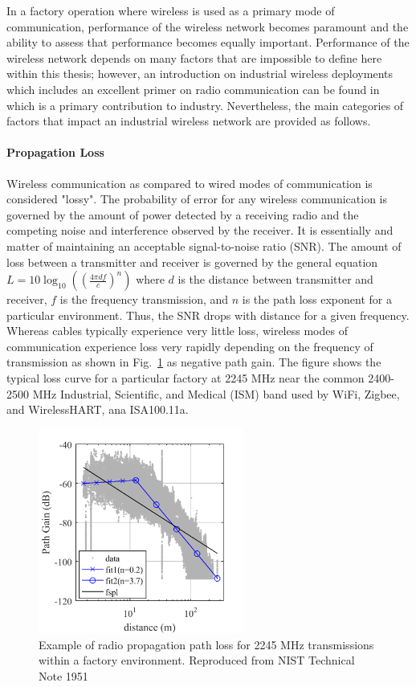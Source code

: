 In a factory operation where wireless is used as a primary mode of communication, performance of the wireless network becomes paramount and the ability to assess that performance becomes equally important.  Performance of the wireless network depends on many factors that are impossible to define here within this thesis; however, an introduction on industrial wireless deployments which includes an excellent primer on radio communication can be found in~\cite{Candell2018.IWSGuide} which is a primary contribution to industry.  Nevertheless, the main categories of factors that impact an industrial wireless network are provided as follows.

\paragraph{Propagation Loss} Wireless communication as compared to wired modes of communication is considered "lossy".  The probability of error for any wireless communication is governed by the amount of power detected by a receiving radio and the competing noise and interference observed by the receiver.  It is essentially and matter of maintaining an acceptable signal-to-noise ratio (SNR). The amount of loss between a transmitter and receiver is governed by the general equation $L=10\log_{10}\left(\left(\frac{4\pi d f}{c}\right)^n\right)$ where $d$ is the distance between transmitter and receiver, $f$ is the frequency transmission, and $n$ is the path loss exponent for a particular environment.  Thus, the SNR drops with distance for a given frequency.  Whereas cables typically experience very little loss, wireless modes of communication experience loss very rapidly depending on the frequency of transmission as shown in Fig.~\ref{intro:pathloss-example} as negative path gain.  The figure shows the typical loss curve for a particular factory at 2245 MHz near the common 2400-2500 MHz Industrial, Scientific, and Medical (ISM) band used by WiFi, Zigbee, and WirelessHART, ana ISA100.11a.

\begin{figure}
	\centering
	\includegraphics[width=0.6\textwidth]{chapter-intro/images/gain2245}
	\caption{Example of radio propagation path loss for 2245 MHz transmissions within a factory environment.  Reproduced from NIST Technical Note 1951~\cite{Candell2017.NIST1951}}
	\label{intro:pathloss-example}
\end{figure}
 
